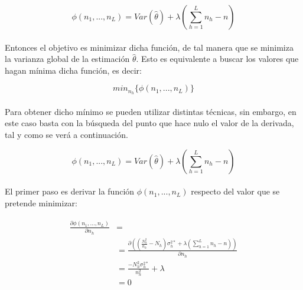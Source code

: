\documentclass{article}
\begin{document}
      \begin{equation}
        \phi(n_1, ..., n_L) = Var(\widehat{\theta}) + \lambda \left( \sum\limits_{h=1}^L n_h - n\right)
      \end{equation}

      \paragraph{}

      Entonces el objetivo es minimizar dicha función, de tal manera que se minimiza la varianza global de la estimación $\widehat{\theta}$. Esto es equivalente a buscar los valores que hagan mínima dicha función, es decir:

      \begin{equation}
        min_{n_h}\{\phi(n_1, ..., n_L)\}
      \end{equation}

      \paragraph{}
      Para obtener dicho mínimo se pueden utilizar distintas técnicas, sin embargo, en este caso basta con la búsqueda del punto que hace nulo el valor de la derivada, tal y como se verá a continuación.

      \begin{equation}
        \phi(n_1, ..., n_L) = Var(\widehat{\theta}) + \lambda \left( \sum\limits_{h=1}^L n_h - n\right)
      \end{equation}


      \paragraph{}
      El primer paso es derivar la función $\phi(n_1, ..., n_L)$ respecto del valor que se pretende minimizar:

      \begin{align}
      \label{eq:derivate_1}
        \begin{split}
          \frac{\partial \phi(n_1, ..., n_L)}{\partial n_h} &= \\
          &= \frac{\partial\left( \left(\frac{N_h^2}{n_h}- N_h\right)\sigma_h^{2*}
          + \lambda \left( \sum\limits_{h=1}^L n_h - n\right)\right) }{\partial n_h} \\
          &= \frac{-N_h^2 \sigma_h^{2*}}{n_h^2} +\lambda \\
          &= 0
        \end{split}
      \end{align}
\end{document}
